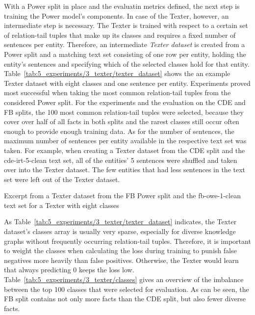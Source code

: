 With a Power split in place and the evaluatin metrics defined, the next step is training the Power model's components. In case of the Texter, however, an intermediate step is necessary. The Texter is trained with respect to a certain set of relation-tail tuples that make up its classes and requires a fixed number of sentences per entity. Therefore, an intermediate \emph{Texter dataset} is created from a Power split and a matching text set consisting of one row per entity, holding the entity's sentences and specifying which of the selected classes hold for that entity. Table~\ref{tab:5_experiments/3_texter/texter_dataset} shows the an example Texter dataset with eight classes and one sentence per entity. Experiments proved most successful when taking the most common relation-tail tuples from the considered Power split. For the experiments and the evaluation on the CDE and FB splits, the 100 most common relation-tail tuples were selected, because they cover over half of all facts in both splits and the rarest classes still occur often enough to provide enough training data. As for the number of sentences, the maximum number of sentences per entity available in the respective text set was taken. For example, when creating a Texter dataset from the CDE split and the cde-irt-5-clean text set, all of the entities' 5 sentences were shuffled and taken over into the Texter dataset. The few entities that had less sentences in the text set were left out of the Texter dataset.

\begin{table}
    \centering
    
    \caption{Excerpt from a Texter dataset from the FB Power split and the fb-owe-1-clean text set for a Texter with eight classes}
    \label{tab:5_experiments/3_texter/texter_dataset}
\end{table}

As Table~\ref{tab:5_experiments/3_texter/texter_dataset} indicates, the Texter dataset's classes array is usually very sparse, especially for diverse knowledge graphs without frequently occurring relation-tail tuples. Therefore, it is important to weight the classes when calculating the loss during training to punish false negatives more heavily than false positives. Otherwise, the Texter would learn that always predicting 0 keeps the loss low. Table~\ref{tab:5_experiments/3_texter/classes} gives an overview of the imbalance between the top 100 classes that were selected for evaluation. As can be seen, the FB split contains not only more facts than the CDE split, but also fewer diverse facts.

